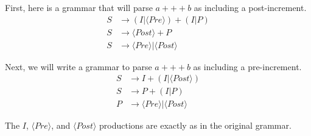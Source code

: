 \documentclass[letterpaper,11pt]{article}
\begin{document}
\begin{enumerate}
        First, here is a grammar that will parse $a+++b$ as including a
        post-increment.
        \begin{align*}
            S &\to (I | \langle Pre \rangle) + (I | P ) \\
            S &\to \langle Post \rangle + P \\
            S &\to \langle Pre \rangle | \langle Post \rangle
        \end{align*}

        Next, we will write a grammar to parse $a+++b$ as including a
        pre-increment.
        \begin{align*}
            S &\to I + ( I | \langle Post \rangle ) \\
            S &\to P + (I | P) \\
            P &\to \langle Pre \rangle | \langle Post \rangle
        \end{align*}

        The $I$, $\langle Pre \rangle$, and $\langle Post \rangle$ productions
        are exactly as in the original grammar.

\end{enumerate}
\end{document}
